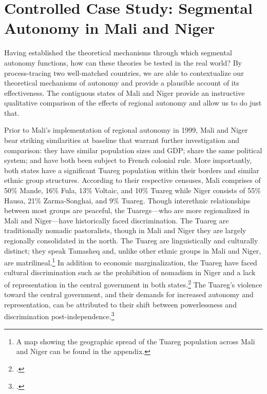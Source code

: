 \documentclass[12pt]{article}
\begin{document}
\section{Controlled Case Study: Segmental Autonomy in Mali and Niger}
Having established the theoretical mechanisms through which segmental autonomy functions, how can these theories be tested in the real world? By process-tracing two well-matched countries, we are able to contextualize our theoretical mechanisms of autonomy and provide a plausible account of its effectiveness. The contiguous states of Mali and Niger provide an instructive qualitative comparison of the effects of regional autonomy and allow us to do just that. 

Prior to Mali's implementation of regional autonomy in 1999, Mali and Niger bear striking similarities at baseline that warrant further investigation and comparison: they have similar population sizes and GDP; share the same political system; and have both been subject to French colonial rule. More importantly, both states have a significant Tuareg population within their borders and similar ethnic group structures. According to their respective censuses, Mali comprises of 50\% Mande, 16\% Fula, 13\% Voltaic, and 10\% Tuareg while Niger consists of 55\% Hausa, 21\% Zarma-Songhai, and 9\% Tuareg. Though interethnic relationships between most groups are peaceful, the Tuaregs---who are more regionalized in Mali and Niger---have historically faced discrimination. The Tuareg are traditionally nomadic pastoralists, though in Mali and Niger they are largely regionally consolidated in the north. The Tuareg are linguistically and culturally distinct; they speak Tamasheq and, unlike other ethnic groups in Mali and Niger, are matrilineal.\footnote{A map showing the geographic spread of the Tuareg population across Mali and Niger can be found in the appendix.} In addition to economic marginalization, the Tuareg have faced cultural discrimination such as the prohibition of nomadism in Niger and a lack of representation in the central government in both states.\footcite{ibrahim_political_1994} The Tuareg's violence toward the central government, and their demands for increased autonomy and representation, can be attributed to their shift between powerlessness and discrimination post-independence.\footcite{vogt_integrating_2015}
\end{document}
